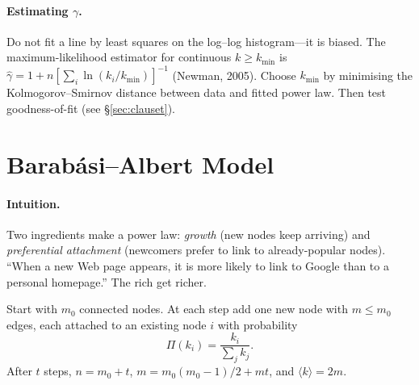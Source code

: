 \paragraph{Estimating $\gamma$.} Do not fit a line by least squares on the log--log histogram---it is biased. The maximum-likelihood estimator for continuous $k\ge k_{\min}$ is $\hat\gamma=1+n[\sum_i\ln(k_i/k_{\min})]^{-1}$ (Newman, 2005). Choose $k_{\min}$ by minimising the Kolmogorov--Smirnov distance between data and fitted power law. Then test goodness-of-fit (see \S\ref{sec:clauset}).

\section{Barab\'asi--Albert Model}
\label{sec:ba-model}
\paragraph{Intuition.} Two ingredients make a power law: \emph{growth} (new nodes keep arriving) and \emph{preferential attachment} (newcomers prefer to link to already-popular nodes). ``When a new Web page appears, it is more likely to link to Google than to a personal homepage.'' The rich get richer.

\begin{definition}\label{def:ba}
Start with $m_0$ connected nodes. At each step add one new node with $m\le m_0$ edges, each attached to an existing node $i$ with probability
\begin{equation}
\Pi(k_i)=\frac{k_i}{\sum_j k_j}.
\end{equation}
After $t$ steps, $n=m_0+t$, $m=m_0(m_0-1)/2+mt$, and $\langle k\rangle=2m$.
\end{definition}

